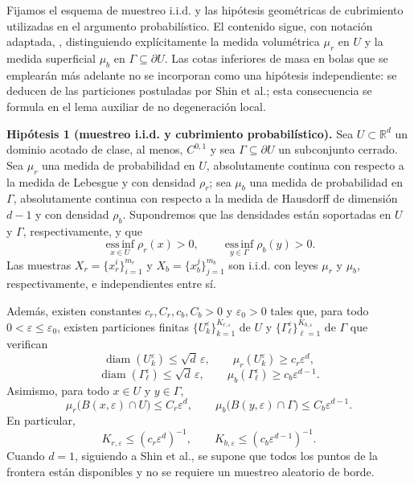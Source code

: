 Fijamos el esquema de muestreo i.i.d. y las hipótesis geométricas de cubrimiento utilizadas en
el argumento probabilístico. El contenido sigue, con notación adaptada,
\cite[Assumption~3.1]{shin2020convergence}, distinguiendo explícitamente la medida volumétrica
$\mu_r$ en $U$ y la medida superficial $\mu_b$ en $\Gamma\subseteq\partial U$. Las cotas
inferiores de masa en bolas que se emplearán más adelante no se incorporan como una hipótesis
independiente: se deducen de las particiones postuladas por Shin et al.; esta consecuencia se
formula en el lema auxiliar de no degeneración local.

\medskip
\noindent\textbf{Hipótesis 1 (muestreo i.i.d. y cubrimiento probabilístico).}
Sea $U\subset\mathbb R^d$ un dominio acotado de clase, al menos, $C^{0,1}$ y sea
$\Gamma\subseteq\partial U$ un subconjunto cerrado. Sea $\mu_r$ una medida de probabilidad
en $U$, absolutamente continua con respecto a la medida de Lebesgue y con densidad $\rho_r$;
sea $\mu_b$ una medida de probabilidad en $\Gamma$, absolutamente continua con respecto a la
medida de Hausdorff de dimensión $d-1$ y con densidad $\rho_b$. Supondremos que las densidades
están soportadas en $U$ y $\Gamma$, respectivamente, y que
\[
\operatorname*{ess\,inf}_{x\in U}\rho_r(x)>0,
\qquad
\operatorname*{ess\,inf}_{y\in\Gamma}\rho_b(y)>0.
\]
Las muestras $X_r=\{x_r^i\}_{i=1}^{m_r}$ y $X_b=\{x_b^j\}_{j=1}^{m_b}$ son i.i.d. con
leyes $\mu_r$ y $\mu_b$, respectivamente, e independientes entre sí.

Además, existen constantes $c_r,C_r,c_b,C_b>0$ y $\varepsilon_0>0$ tales que, para todo
$0<\varepsilon\leq\varepsilon_0$, existen particiones finitas
$\{U_k^{\varepsilon}\}_{k=1}^{K_{r,\varepsilon}}$ de $U$ y
$\{\Gamma_\ell^{\varepsilon}\}_{\ell=1}^{K_{b,\varepsilon}}$ de $\Gamma$ que verifican
\[
\operatorname{diam}(U_k^{\varepsilon})\leq \sqrt d\,\varepsilon,
\qquad
\mu_r(U_k^{\varepsilon})\geq c_r\varepsilon^d,
\]
\[
\operatorname{diam}(\Gamma_\ell^{\varepsilon})\leq \sqrt d\,\varepsilon,
\qquad
\mu_b(\Gamma_\ell^{\varepsilon})\geq c_b\varepsilon^{d-1}.
\]
Asimismo, para todo $x\in U$ y $y\in\Gamma$,
\[
\mu_r\bigl(B(x,\varepsilon)\cap U\bigr)\leq C_r\varepsilon^d,
\qquad
\mu_b\bigl(B(y,\varepsilon)\cap\Gamma\bigr)\leq C_b\varepsilon^{d-1}.
\]
En particular,
\[
K_{r,\varepsilon}\leq(c_r\varepsilon^d)^{-1},
\qquad
K_{b,\varepsilon}\leq(c_b\varepsilon^{d-1})^{-1}.
\]
Cuando $d=1$, siguiendo a Shin et al., se supone que todos los puntos de la frontera están
disponibles y no se requiere un muestreo aleatorio de borde.

